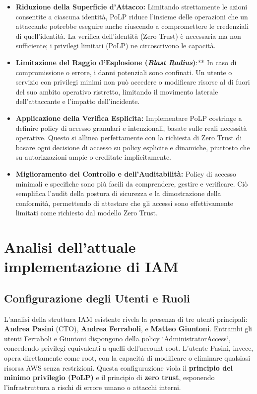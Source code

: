 \documentclass[a4paper,12pt]{report}
\begin{document}
\begin{itemize}
    \item \textbf{Riduzione della Superficie d'Attacco:} Limitando strettamente le azioni consentite a ciascuna identità, PoLP riduce l'insieme delle operazioni che un attaccante potrebbe eseguire anche riuscendo a compromettere le credenziali di quell'identità. La verifica dell'identità (Zero Trust) è necessaria ma non sufficiente; i privilegi limitati (PoLP) ne circoscrivono le capacità.
    \item \textbf{Limitazione del Raggio d'Esplosione (\textit{Blast Radius})}:** In caso di compromissione o errore, i danni potenziali sono confinati. Un utente o servizio con privilegi minimi non può accedere o modificare risorse al di fuori del suo ambito operativo ristretto, limitando il movimento laterale dell'attaccante e l'impatto dell'incidente.
    \item \textbf{Applicazione della Verifica Esplicita:} Implementare PoLP costringe a definire policy di accesso granulari e intenzionali, basate sulle reali necessità operative. Questo si allinea perfettamente con la richiesta di Zero Trust di basare ogni decisione di accesso su policy esplicite e dinamiche, piuttosto che su autorizzazioni ampie o ereditate implicitamente.
    \item \textbf{Miglioramento del Controllo e dell'Auditabilità:} Policy di accesso minimali e specifiche sono più facili da comprendere, gestire e verificare. Ciò semplifica l'audit della postura di sicurezza e la dimostrazione della conformità, permettendo di attestare che gli accessi sono effettivamente limitati come richiesto dal modello Zero Trust.
\end{itemize}
\section{Analisi dell'attuale implementazione di IAM}
\subsection{Configurazione degli Utenti e Ruoli}

L'analisi della struttura IAM esistente rivela la presenza di tre utenti principali: \textbf{Andrea Pasini} (CTO), \textbf{Andrea Ferraboli}, e \textbf{Matteo Giuntoni}. Entrambi gli utenti Ferraboli e Giuntoni dispongono della policy `AdministratorAccess`, concedendo privilegi equivalenti a quelli dell'account root. L'utente Pasini, invece, opera direttamente come root, con la capacità di modificare o eliminare qualsiasi risorsa AWS senza restrizioni. Questa configurazione viola il \textbf{principio del minimo privilegio (PoLP)} e il principio di \textbf{zero trust}, esponendo l'infrastruttura a rischi di errore umano o attacchi interni\cite{ref5}.
\end{document}
